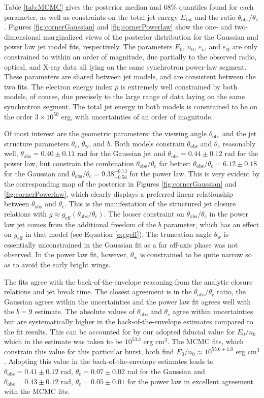 \documentclass[twocolumn]{aastex62}
\newcommand{\thobs}{\ensuremath{\theta_{\mathrm{obs}}}}
\newcommand{\thW}{\ensuremath{\theta_{\mathrm{w}}}}
\newcommand{\thC}{\ensuremath{\theta_{\mathrm{c}}}}
\newcommand{\epse}{\ensuremath{\varepsilon_{\mathrm{e}}}}
\newcommand{\epsB}{\ensuremath{\varepsilon_{\mathrm{B}}}}
\newcommand{\Etot}{\ensuremath{E_{\mathrm{tot}}}}
\newcommand{\geff}{\ensuremath{g_{\mathrm{eff}}}}
\begin{document}
Table \ref{tab:MCMC} gives the posterior median and 68\% quantiles found for each parameter, as well as constraints on the total jet energy \Etot{} and the ratio $\thobs/\thC$. Figures \ref{fig:cornerGaussian} and \ref{fig:cornerPowerlaw} show the one- and two-dimensional marginalized views of the posterior distribution for the Gaussian and power law jet model fits, respectively.  The parameters $E_0$, $n_0$, $\epse$, and $\epsB$ are only constrained to within an order of magnitude, due partially to the observed radio, optical, and X-ray data all lying on the same synchrotron power-law segment.  These parameters are shared between jet models, and are consistent between the two fits.  The electron energy index $p$ is extremely well constrained by both models, of course, due precisely to the large range of data laying on the same synchrotron segment.  The total jet energy in both models is constrained to be on the order $3 \times 10^{50}$ erg, with uncertainties of an order of magnitude.

Of most interest are the geometric parameters: the viewing angle $\thobs$ and the jet structure parameters $\thC$, $\thW$, and $b$. Both models constrain $\thobs$ and $\thC$ reasonably well, $\thobs = 0.40 \pm 0.11$ rad for the Gaussian jet and $\thobs = 0.44 \pm 0.12$ rad for the power law, but constrain the combination $\thobs/\thC$ far better: $\thobs/\thC  = 6.12 \pm 0.18$ for the Gaussian and $\thobs/\thC  = 9.38^{+0.73}_{-0.56}$ for the power law. This is very evident by the corresponding map of the posterior in Figures \ref{fig:cornerGaussian} and \ref{fig:cornerPowerlaw}, which clearly displays a preferred linear relationship between $\thobs$ and $\thC$. This is the manifestation of the structured jet closure relations with $g \approx \geff(\thobs/\thC)$.  The looser constraint on $\thobs/\thC$ in the power law jet comes from the additional freedom of the $b$ parameter, which has an effect on $\geff$ in that model (see Equation \eqref{eq:geff}). The truncation angle $\thW$ is essentially unconstrained in the Gaussian fit as a far off-axis phase was not observed.  In the power law fit, however, $\thW$ is constrained to be quite narrow so as to avoid the early bright wings.

The fits agree with the back-of-the-envelope reasoning from the analytic closure relations and jet break time.  The closest agreement is in the $\thobs/\thC$ ratio, the Gaussian agrees within the uncertainties and the power law fit agrees well with the $b=9$ estimate. The absolute values of $\thobs$ and $\thC$ agree within uncertainties but are systematically higher in the back-of-the-envelope estimates compared to the fit results.  This can be accounted for by our adopted fiducial value for $E_0/n_0$ which in the estimate was taken to be $10^{53.3}$ erg cm$^3$.  The MCMC fits, which constrain this value for this particular burst, both find $E_0/n_0 \approx 10^{55.6 \pm 1.0}$ erg cm$^{3}$.  Adopting this value in the back-of-the-envelope estimates leads to $\thobs = 0.41\pm0.12$ rad, $\thC = 0.07 \pm 0.02$ rad for the Gaussian and $\thobs = 0.43\pm0.12$ rad, $\thC = 0.05 \pm 0.01$ for the power law in excellent agreement with the MCMC fits. 
\end{document}
